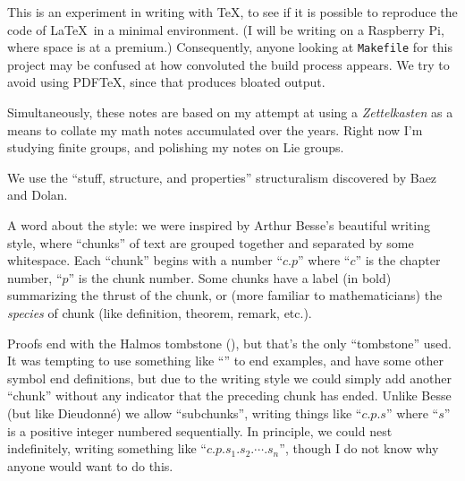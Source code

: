 \preface

This is an experiment in writing with \TeX, to see if it is possible to
reproduce the code of \LaTeX\ in a minimal environment. (I will be
writing on a Raspberry Pi, where space is at a premium.) Consequently,
anyone looking at {\tt Makefile} for this project may be confused at how
convoluted the build process appears. We try to avoid using PDF\TeX,
since that produces bloated output.

Simultaneously, these notes are based on my attempt at using a
\emph{Zettelkasten} as a means to collate my math notes accumulated over
the years. Right now I'm studying finite groups, and polishing my notes
on Lie groups.

We use the ``stuff, structure, and properties'' structuralism discovered
by Baez and Dolan.

\bigbreak

A word about the style: we were inspired by Arthur Besse's beautiful
writing style, where ``chunks'' of text are grouped together and
separated by some whitespace. Each ``chunk'' begins with a number
``$c.p$'' where ``$c$'' is the chapter number, ``$p$'' is the chunk
number. Some chunks have a label (in bold) summarizing the thrust of the
chunk, or (more familiar to mathematicians) the \emph{species} of chunk
(like definition, theorem, remark, etc.).

Proofs end with the Halmos tombstone (\qedsymbol), but that's the only
``tombstone'' used. It was tempting to use something like ``\qefsymbol'' to
end examples, and have some other symbol end definitions, but due to the
writing style we could simply add another ``chunk'' without any
indicator that the preceding chunk has ended.
Unlike Besse (but like Dieudonn\'e) we allow ``subchunks'', writing
things like ``$c.p.s$'' where ``$s$'' is a positive integer numbered
sequentially. In principle, we could nest indefinitely, writing
something like ``$c.p.s_{1}.s_{2}.\cdots.s_{n}$'', though I do not know
why anyone would want to do this.
